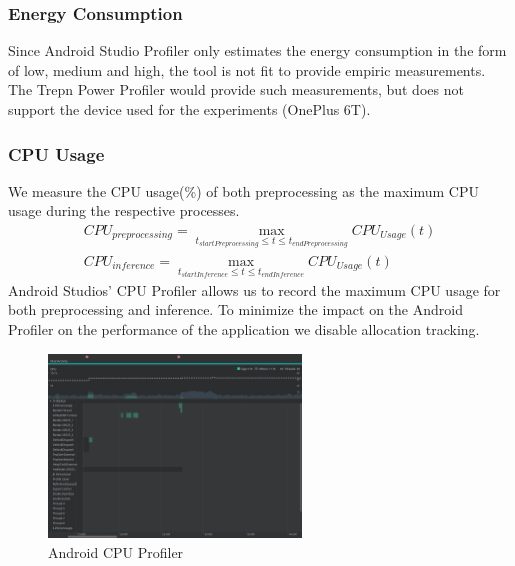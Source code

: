 \subsubsection{Energy Consumption}
Since Android Studio Profiler only estimates the energy consumption in the form of low, medium and high, the tool is not fit to provide empiric measurements. The Trepn Power Profiler would provide such measurements, but does not support the device used for the experiments (OnePlus 6T).
\subsubsection{CPU Usage}
We measure the CPU usage(\%) of both preprocessing as the maximum CPU usage during the respective processes.
\begin{equation*}
\begin{gathered}
CPU_{preprocessing} = \max\limits_{t_{startPreprocessing} \leq t \leq t_{endPreprocessing}} CPU_{Usage}(t)\\
CPU_{inference} = \max\limits_{t_{startInference} \leq t \leq t_{endInference}} CPU_{Usage}(t)
\end{gathered}
\end{equation*}
Android Studios’ CPU Profiler allows us to record the maximum CPU usage for both preprocessing and inference. To minimize the impact on the Android Profiler on the performance of the application we disable allocation tracking.
\begin{figure}[H]
\centering  
\includegraphics[width=0.6\textwidth]{./Bilder/profiler_CPU}
\caption{Android CPU Profiler}
\label{fig:prof_cpu}
\end{figure}
